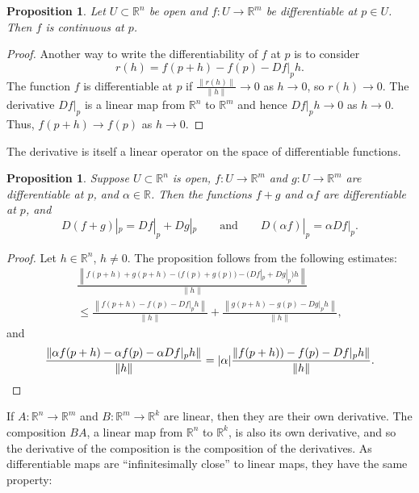 \documentclass[12pt,openany]{book}
\newcommand{\sabs}[1]{\lvert {#1} \rvert}
\newcommand{\snorm}[1]{\lVert {#1} \rVert}
\newcommand{\norm}[1]{\left\lVert {#1} \right\rVert}
\newcommand{\R}{{\mathbb{R}}}
\newcommand{\myquote}[1]{``#1''}
\theoremstyle{plain}
\newtheorem{prop}[thm]{Proposition}
\theoremstyle{remark}
\theoremstyle{definition}
\theoremstyle{exercise}
\theoremstyle{example}
\begin{document}
\begin{prop}
Let $U \subset \R^n$ be open and $f \colon U \to \R^m$ be
differentiable at $p \in U$.  Then $f$ is continuous at $p$.
\end{prop}

\begin{proof}
Another way to write the differentiability of $f$ at $p$ is to consider
\begin{equation*}
r(h) = f(p+h)-f(p) - Df|_p h .
\end{equation*}
The function $f$ is differentiable at $p$ if
$\frac{\snorm{r(h)}}{\snorm{h}} \to 0$ as $h \to 0$,
so
$r(h) \to 0$.  The derivative $D f|_p$
is a linear map from $\R^n$ to $\R^m$ and hence
$D f|_p h \to 0$ as $h \to 0$.  Thus,
$f(p+h) \to f(p)$ as $h \to 0$.
\end{proof}

The derivative is itself a linear operator on the space of differentiable
functions.

\begin{prop}
Suppose $U \subset \R^n$ is open,
$f \colon U \to \R^m$ and
$g \colon U \to \R^m$ are differentiable at $p$,
and $\alpha \in \R$.  Then the functions $f+g$ and $\alpha f$
are differentiable at $p$, and
\begin{equation*}
D(f+g)|_p = Df|_p + Dg|_p \qquad \text{and} \qquad D(\alpha f)|_p = \alpha
Df|_p .
\end{equation*}
\end{prop}

\begin{proof}
Let $h \in \R^n$, $h \neq 0$.  The proposition follows from the following
estimates:
\begin{multline*}
\frac{\norm{f(p+h)+g(p+h)-\bigl(f(p)+g(p)\bigr) - \bigl(Df|_p + Dg|_p\bigr)h}}{\snorm{h}}
\\
\leq
\frac{\norm{f(p+h)-f(p) - Df|_ph}}{\snorm{h}}
+
\frac{\norm{g(p+h)-g(p) - Dg|_ph}}{\snorm{h}} ,
\end{multline*}
and
\begin{equation*}
\frac{\norm{\alpha f(p+h) - \alpha f(p) - \alpha Df|_p h}}{\snorm{h}}
=
\sabs{\alpha} \frac{\norm{f(p+h))-f(p) - Df|_ph}}{\snorm{h}} .
\qedhere
\end{equation*}
\end{proof}

If $A \colon \R^n \to \R^m$ and $B \colon \R^m \to \R^k$ are linear, then 
they are their own derivative.  The composition
$BA$, a linear map from $\R^n$ to $\R^k$, is also its own derivative, and
so the derivative of the composition is the composition
of the derivatives.
As differentiable maps are \myquote{infinitesimally close}
to linear maps, they have the same property:
\end{document}
